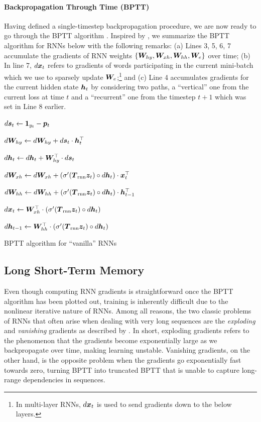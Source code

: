\paragraph{Backpropagation Through Time (BPTT)}
Having defined a single-timestep backpropagation procedure, we are now ready to
go through the BPTT algorithm \cite{Rumelhart:1986:LPT,werbos1990}. Inspired by 
, we summarize the BPTT algorithm for RNNs below with the
following remarks: (a) Lines 3, 5, 6, 7 accumulate the gradients of RNN weights
$\{\bm{W}_{hy}, \bm{W}_{xh}, \bm{W}_{hh}, \bm{W}_{e}\}$ over time; (b) In line 7, $d\bm{x}_{t}$ refers to
gradients of words participating in the current mini-batch which we use to
sparsely update $\bm{W}_{e}$;\footnote{In multi-layer
RNNs, $d\bm{x}_{t}$ is used to send gradients down to the below layers.} and (c) Line
4 accumulates gradients for the current hidden state $\bm{h}_{t}$ by considering two paths,
a ``vertical'' one from  the current loss at time $t$ and a ``recurrent'' one from the timestep
$t+1$ which was set in Line 8 earlier.

\begin{algorithm}
{
$d\bm{s}_{t} \leftarrow \bm{1}_{y_t} - \bm{p}_{t}$

$d\bm{W}_{hy} \leftarrow d\bm{W}_{hy} + d\bm{s}_{t} \cdot \bm{h}_{t}^\top$

$d\bm{h}_{t} \leftarrow d\bm{h}_{t} + \bm{W}_{hy}^\top \cdot d\bm{s}_{t}$

$d\bm{W}_{xh} \leftarrow d\bm{W}_{xh} + \left(\sigma'(\mbox{\boldmath{$T$}}_{\text{rnn}} \bm{z}_{t}) \circ d\bm{h}_{t}\right) \cdot \bm{x}_{t}^\top$

$d\bm{W}_{hh} \leftarrow d\bm{W}_{hh} + \left(\sigma'(\mbox{\boldmath{$T$}}_{\text{rnn}} \bm{z}_{t}) \circ d\bm{h}_{t}\right) \cdot \bm{h}_{t-1}^\top$

$d\bm{x}_{t} \leftarrow \bm{W}_{xh}^\top \cdot \left(\sigma'(\mbox{\boldmath{$T$}}_{\text{rnn}} \bm{z}_{t}) \circ d\bm{h}_{t}\right)$

$d\bm{h}_{t-1} \leftarrow \bm{W}_{hh}^\top \cdot \left(\sigma'(\mbox{\boldmath{$T$}}_{\text{rnn}} \bm{z}_{t}) \circ d\bm{h}_{t}\right)$
}
\caption{BPTT algorithm for ``vanilla'' RNNs}
\end{algorithm}

\subsection{Long Short-Term Memory} %
Even though computing RNN gradients is straightforward once 
the BPTT algorithm has been plotted out, training is inherently difficult due to the nonlinear
iterative nature of RNNs. Among all reasons, 
the two classic problems of RNNs that often arise when dealing with very long sequences are the {\it
exploding} and {\it vanishing} gradients as
described by . In short, exploding gradients refers to the
phenomenon that the gradients become exponentially large as we backpropagate
over time, making learning unstable. Vanishing gradients, on the
other hand, is the opposite problem when the gradients go exponentially fast
towards zero, turning BPTT into truncated BPTT that is unable to capture long-range
dependencies in sequences. 

